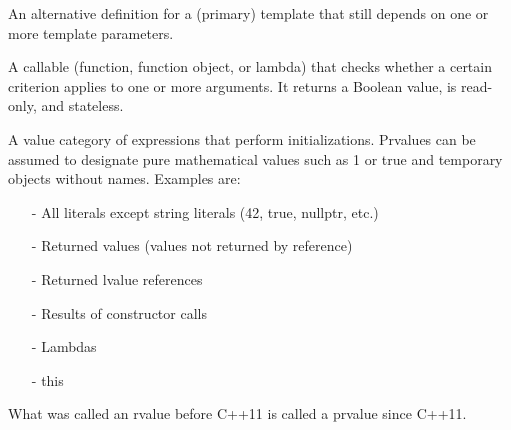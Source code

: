 


An alternative definition for a (primary) template that still depends on one or more template parameters.


A callable (function, function object, or lambda) that checks whether a certain criterion applies to one or more arguments. It returns a Boolean value, is read-only, and stateless.


A value category of expressions that perform initializations. Prvalues can be assumed to designate pure mathematical values such as 1 or true and temporary objects without names. Examples are:

\begin{itemize}
\item [-]
All literals except string literals (42, true, nullptr, etc.)

\item [-]
Returned values (values not returned by reference)

\item [-]
Returned lvalue references

\item [-]
Results of constructor calls

\item [-]
Lambdas

\item [-]
this
\end{itemize}

What was called an rvalue before C++11 is called a prvalue since C++11.








